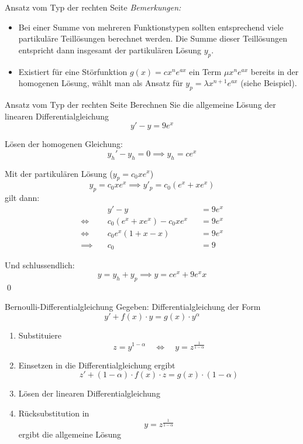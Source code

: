 \documentclass[german]{../spicker}
\begin{document}
\begin{algo}{Ansatz vom Typ der rechten Seite}
    \emph{Bemerkungen:}
    \begin{itemize}
        \item Bei einer Summe von mehreren Funktionstypen sollten entsprechend viele partikuläre Teillösungen berechnet werden. Die Summe dieser Teillösungen entspricht dann insgesamt der partikulären Lösung $y_p$.
        \item Existiert für eine Störfunktion $g(x) = cx^ne^{ax}$ ein Term $\mu x^ne^{ax}$ bereits in der homogenen Lösung, wählt man als Ansatz für $y_p = \lambda x^{n+1}e^{ax}$ (siehe Beispiel).
    \end{itemize}
\end{algo}

\begin{example}{Ansatz vom Typ der rechten Seite}
    Berechnen Sie die allgemeine Lösung der linearen Differentialgleichung
    $$
        y'- y = 9e^x
    $$
    \exampleseparator

    Lösen der homogenen Gleichung:
    $$
        y_h'- y_h = 0 \implies y_h = ce^{x}
    $$

    Mit der partikulären Lösung ($y_p = c_0xe^{x}$)
    $$
        y_p = c_0xe^x \implies y'_p = c_0(e^x + xe^x)
    $$
    gilt dann:
    $$
        \begin{aligned}
                           & y'- y                     &  & = 9e^x \\
            \iff \quad     & c_0(e^x + xe^x) - c_0xe^x &  & = 9e^x \\
            \iff \quad     & c_0e^x(1 + x - x)         &  & = 9e^x \\
            \implies \quad & c_0                       &  & = 9
        \end{aligned}
    $$

    Und schlussendlich:
    $$
        y = y_h + y_p \implies y = ce^x + 9e^xx
    $$\qed
\end{example}

\begin{algo}{Bernoulli-Differentialgleichung}
    Gegeben: Differentialgleichung der Form
    $$
        \boxed{y' + f(x) \cdot y = g(x)\cdot y^\alpha}
    $$
    \begin{enumerate}
        \item Substituiere
              $$
                  z = y^{1-\alpha} \quad \iff \quad y = z^{\frac{1}{1-\alpha}}
              $$
        \item Einsetzen in die Differentialgleichung ergibt
              $$
                  z' + (1-\alpha) \cdot f(x)\cdot z = g(x) \cdot (1-\alpha)
              $$
        \item Lösen der linearen Differentialgleichung
        \item Rücksubstitution in
              $$
                  y = z^{\frac{1}{1-\alpha}}
              $$
              ergibt die allgemeine Lösung
    \end{enumerate}
\end{algo}
\end{document}
